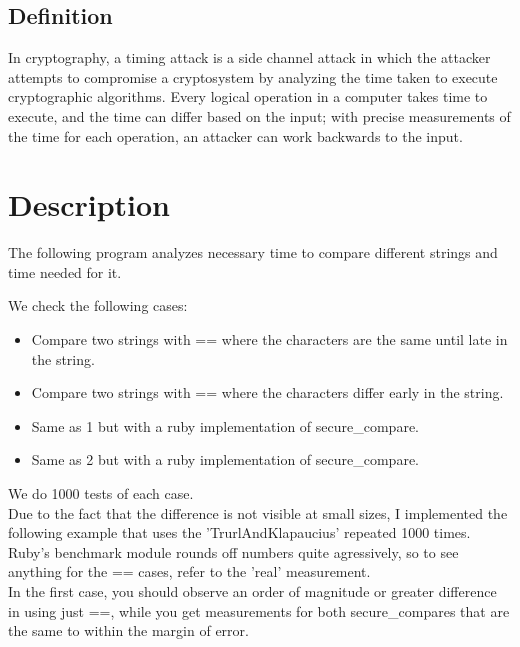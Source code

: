 \documentclass{article}
\begin{document}
  \subsection{Definition}

  In cryptography, a timing attack is a side channel attack in which the attacker attempts to compromise a cryptosystem by analyzing the time taken to execute cryptographic algorithms. 
  Every logical operation in a computer takes time to execute, and the time can differ based on the input; with precise measurements of the time for each operation, an attacker can
  work backwards to the input.


  \section{Description}

  The following program analyzes necessary time to compare different strings and time needed for it.

  We check the following cases:

  \begin{itemize}
    \item Compare two strings with == where the characters are the same until late in the string.
    \item Compare two strings with == where the characters differ early in the string.
    \item  Same as 1 but with a ruby implementation of secure\_compare.
    \item Same as 2 but with a ruby implementation of secure\_compare.
  \end{itemize}

  We do 1000 tests of each case. \\

  Due to the fact that the difference is not visible at small sizes, I implemented the following 
  example that uses the 'TrurlAndKlapaucius' repeated 1000 times. \\

  Ruby's benchmark module rounds off numbers quite agressively, so to see anything for the
  == cases, refer to the 'real' measurement. \\

  In the first case, you should observe an order of magnitude or greater difference in using
  just ==, while you get measurements for both secure\_compares that are the same to within
  the margin of error. \\
\end{document}
